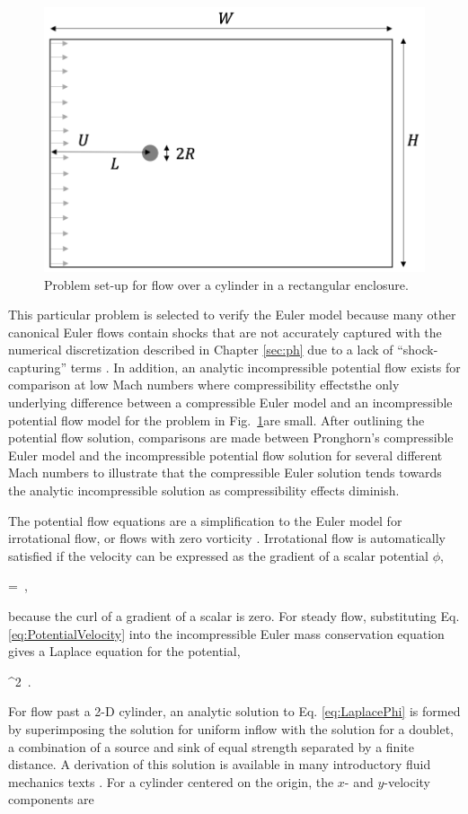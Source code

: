 \begin{figure}[!h]
\centering
\includegraphics[width=0.5\linewidth]{figs/pf_geometry.png}
\caption{Problem set-up for flow over a cylinder in a rectangular enclosure.}
\label{fig:pf_geometry}
\end{figure}

This particular problem is selected to verify the Euler model because many other canonical Euler flows contain shocks that are not accurately captured with the numerical discretization described in Chapter \ref{sec:ph} due to a lack of ``shock-capturing'' terms \cite{hughes_1986,tezduyar_1986}. In addition, an analytic incompressible potential flow exists for comparison at low Mach numbers where compressibility effects\mdash the only underlying difference between a compressible Euler model and an incompressible potential flow model for the problem in Fig.\ \ref{fig:pf_geometry}\mdash are small. After outlining the potential flow solution, comparisons are made between Pronghorn's compressible Euler model and the incompressible potential flow solution for several different Mach numbers to illustrate that the compressible Euler solution tends towards the analytic incompressible solution as compressibility effects diminish.

The potential flow equations are a simplification to the Euler model for irrotational flow, or flows with zero vorticity \cite{munson,hirsch}. Irrotational flow is automatically satisfied if the velocity can be expressed as the gradient of a scalar potential \(\phi\),

\beq
\label{eq:PotentialVelocity}
=\nabla\phi\ ,
\eeq

\noindent because the curl of a gradient of a scalar is zero. For steady flow, substituting Eq. \eqref{eq:PotentialVelocity} into the incompressible Euler mass conservation equation gives a Laplace equation for the potential,

\beq
\label{eq:LaplacePhi}
\nabla^2\ .
\eeq

\noindent For flow past a 2-D cylinder, an analytic solution to Eq. \eqref{eq:LaplacePhi} is formed by superimposing the solution for uniform inflow with the solution for a doublet, a combination of a source and sink of equal strength separated by a finite distance. A derivation of this solution is available in many introductory fluid mechanics texts \cite{munson}. For a cylinder centered on the origin, the \(x\)- and \(y\)-velocity components are

